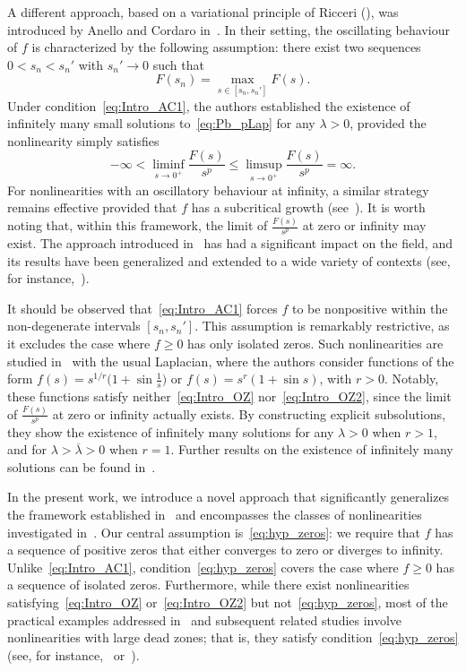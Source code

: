 \documentclass[10pt,twoside,english,reqno,a4paper]{amsart}
\theoremstyle{plain}
\theoremstyle{plain}
\theoremstyle{definition}
\theoremstyle{remark}
\numberwithin{equation}{section}
\begin{document}
A different approach, based on a variational principle of Ricceri (\cite{Ric00}), was introduced by Anello and Cordaro in~\cite{AC02}. In their setting, the oscillating behaviour of $f$ is characterized by the following assumption: there exist two sequences $0<s_n<s_n'$ with $s_n'\to 0$ such that
\begin{equation}
\label{eq:Intro_AC1}
F(s_n) = \max_{s\in[s_n,s_n']} F(s).
\end{equation}
Under condition~\eqref{eq:Intro_AC1}, the authors established the existence of infinitely many small solutions to~\eqref{eq:Pb_pLap} for any $\lambda>0$, provided the nonlinearity simply satisfies
\begin{equation*}
-\infty < \liminf_{s\to 0^+} \frac{F(s)}{s^p}  \leq \limsup_{s\to 0^+} \frac{F(s)}{s^p} = \infty.
\end{equation*}
For nonlinearities with an oscillatory behaviour at infinity, a similar strategy remains effective provided that $f$ has a subcritical growth (see~\cite{MP14}). It is worth noting that, within this framework, the limit of $\frac{F(s)}{s^p}$ at zero or infinity may exist. The approach introduced in~\cite{AC02} has had a significant impact on the field, and its results have been generalized and extended to a wide variety of contexts (see, for instance,~\cite{HZ09, MP14}).

It should be observed that~\eqref{eq:Intro_AC1} forces $f$ to be nonpositive within the non-degenerate intervals $[s_n,s_n']$. This assumption is remarkably restrictive, as it excludes the case where $f\geq 0$ has only isolated zeros. Such nonlinearities are studied in~\cite{CMM25} with the usual Laplacian, where the authors consider functions of the form $f(s)=s^{1/r}\big(1+\sin\frac{1}{s}\big)$ or $f(s)=s^r(1+\sin s)$, with $r>0$. Notably, these functions satisfy neither~\eqref{eq:Intro_OZ} nor~\eqref{eq:Intro_OZ2}, since the limit of $\frac{F(s)}{s^p}$ at zero or infinity actually exists. By constructing explicit subsolutions, they show the existence of infinitely many solutions for any $\lambda>0$ when $r>1$, and for $\lambda>\overline{\lambda}>0$ when $r=1$. Further results on the existence of infinitely many solutions can be found in~\cite{CCGS16, FS25, KM10,  Ryn00}.


In the present work, we introduce a novel approach that significantly generalizes the framework established in~\cite{AC02} and encompasses the classes of nonlinearities investigated in~\cite{CMM25}. Our central assumption is~\eqref{eq:hyp_zeros}: we require that $f$ has a sequence of positive zeros that either converges to zero or diverges to infinity. Unlike~\eqref{eq:Intro_AC1}, condition~\eqref{eq:hyp_zeros} covers the case where $f\geq 0$ has a sequence of isolated zeros. Furthermore, while there exist nonlinearities satisfying~\eqref{eq:Intro_OZ} or~\eqref{eq:Intro_OZ2} but not~\eqref{eq:hyp_zeros}, most of the practical examples addressed in~\cite{OZ96} and subsequent related studies involve nonlinearities with large dead zones; that is, they satisfy condition~\eqref{eq:hyp_zeros} (see, for instance,~\cite[Section~4]{BM10} or~\cite[Section~4]{BMR12}).
\end{document}
